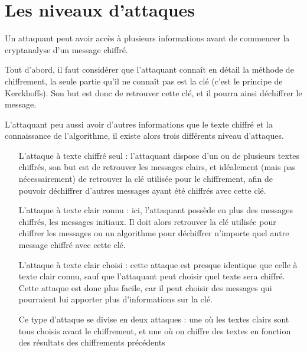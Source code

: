 \section{Les niveaux d'attaques}
Un attaquant peut avoir accès à plusieurs informations avant de
commencer la cryptanalyse d'un message chiffré.

Tout d'abord, il faut considérer que l'attaquant connaît en détail
la méthode de chiffrement, la seule partie qu'il ne connaît pas
est la clé (c'est le principe de
Kerckhoffs). Son but est donc de
retrouver cette clé, et il pourra ainsi déchiffrer le message.

L'attaquant peu aussi avoir d'autres informations que le texte
chiffré et la connaissance de l'algorithme, il existe alors trois
différents niveau d'attaques.

\begin{itemize}
  \renewcommand{\makelabel}[1]{\sffamily\textbf{#1}}
  \item[L'attaque à texte chiffré seul] :
    l'attaquant dispose d'un ou de plusieurs textes chiffrés, son but
    est de retrouver les messages clairs, et idéalement (mais pas
    nécessairement) de retrouver la clé utilisée pour le chiffrement,
    afin de pouvoir déchiffrer d'autres messages ayant été chiffrés
    avec cette clé.

  \item[L'attaque à texte clair connu] :
    ici, l'attaquant possède en plus des messages chiffrés, les
    messages initiaux. Il doit alors retrouver la clé utilisée pour 
    chiffrer les messages ou un algorithme pour déchiffrer n'importe
    quel autre message chiffré avec cette clé. 

  \item[L'attaque à texte clair choisi] :
    cette attaque est presque identique que celle à texte clair connu,
    sauf que l'attaquant peut choisir quel texte sera chiffré. Cette
    attaque est donc plus facile, car il peut choisir des messages qui
    pourraient lui apporter plus d'informations sur la clé.

    Ce type d'attaque se divise en deux attaques : une où les textes
    clairs sont tous choisis avant le chiffrement, et une où on
    chiffre des textes en fonction des résultats des chiffrements
    précédents

\end{itemize}
